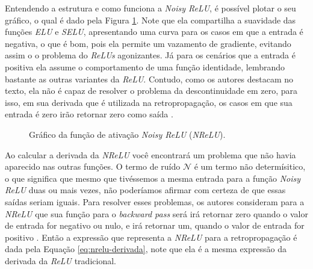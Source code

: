Entendendo a estrutura e como funciona a \textit{Noisy ReLU}, é possível plotar o seu gráfico, o qual é dado pela Figura \ref{fig:nrelu}. Note que ela compartilha a suavidade das funções \textit{ELU} e \textit{SELU}, apresentando uma curva para os casos em que a entrada é negativa, o que é bom, pois ela permite um vazamento de gradiente, evitando assim o o problema do \textit{ReLUs} agonizantes. Já para os cenários que a entrada é positiva ela assume o comportamento de uma função identidade, lembrando bastante as outras variantes da \textit{ReLU}. Contudo, como os autores destacam no texto, ela não é capaz de resolver o problema da descontinuidade em zero, para isso, em sua derivada que é utilizada na retropropagação, os casos em que sua entrada é zero irão retornar zero como saída \parencite{Nair2010}.

\begin{figure}[h!]
    \centering
    \caption{Gráfico da função de ativação \textit{Noisy ReLU} (\textit{NReLU}).}
    \label{fig:nrelu}
\end{figure}

Ao calcular a derivada da \textit{NReLU} você encontrará um problema que não havia aparecido nas outras funções. O termo de ruído $\mathcal{N}$ é um termo não determísitico, o que significa que mesmo que tivéssemos a mesma entrada para a função \textit{Noisy ReLU} duas ou mais vezes, não poderíamos afirmar com certeza de que essas saídas seriam iguais. Para resolver esses problemas, os autores consideram para a \textit{NReLU} que sua função para o \textit{backward pass} será irá retornar zero quando o valor de entrada for negativo ou nulo, e irá retornar um, quando o valor de entrada for positivo \parencite{Nair2010}. Então a expressão que representa a \textit{NReLU} para a retropropagação é dada pela Equação \ref{eq:nrelu-derivada}, note que ela é a mesma expressão da derivada da \textit{ReLU} tradicional.

